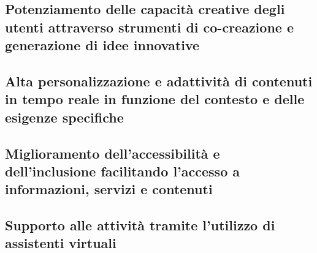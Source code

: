     \subsection{Potenziamento delle capacità creative degli utenti attraverso strumenti di co-creazione e generazione di idee innovative}
    
    \subsection{Alta personalizzazione e adattività di contenuti in tempo reale in funzione del contesto e delle esigenze specifiche}
    
    \subsection{Miglioramento dell'accessibilità e dell'inclusione facilitando l'accesso a informazioni, servizi e contenuti}
    
    \subsection{Supporto alle attività tramite l’utilizzo di assistenti virtuali}
    
    
